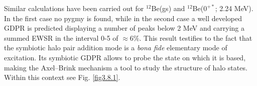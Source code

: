 \begin{subappendices}
 Similar calculations have been  carried out for $^{12}$Be(gs) and $^{12}$Be($0^{+*}$; 2.24 MeV). In the first case no pygmy is found, while in the second case a well developed GDPR is predicted displaying a number of peaks below 2 MeV and carrying a summed EWSR in the interval 0-5 of $\approx 6\%$. This result testifies to the fact that the symbiotic halo pair addition mode is a \textit{bona fide} elementary mode of excitation. Its symbiotic GDPR allows to probe the state on which it is based, making the Axel--Brink mechanism a tool to study the structure of halo states. Within this context see Fig. \ref{fig3.8.1}. 





















\end{subappendices}



\clearpage
\newpage
















 
%

% 
